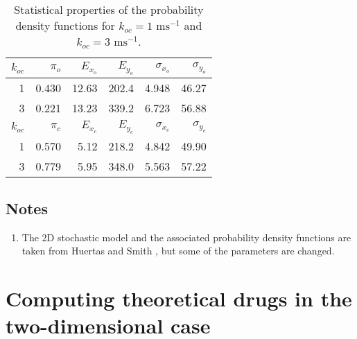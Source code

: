{
\begin{table}  \begin{center}
\begin{tabular}
[c]{|r|r|r|r||r|r|}\hline 
\rule{0pt}{4mm}   $k_{oc}$ & $\pi_o $ & $E_{x_o}$ & $E_{y_o}$
& $\sigma_{x_o}$ & $\sigma_{y_o}$
\\[1mm]\hline\hline
1 & 0.430 & 12.63 & 202.4 &4.948 &  46.27\\\hline
3 & 0.221 & 13.23 & 339.2 &6.723 &  56.88 \\ \hline \hline
\rule{0pt}{4mm} $k_{oc}$ & $\pi_c$ &$E_{x_c}$ & $E_{y_c}$ 
& $\sigma_{x_c}$ & $\sigma_{y_c}$
\\[1mm]\hline\hline
1 & 0.570& 5.12 & 218.2 &4.842 &  49.90\\\hline
3 & 0.779 &5.95& 348.0  &5.563 &  57.22\\\hline
\end{tabular}
 \end{center}
\caption{Statistical properties of the probability density functions 
for $k_{oc}=1 \text{ ms}^{-1}$ and  $k_{oc}=3 \text{ ms}^{-1}$.
\label{tab:more_open}}
\end{table}


\section{Notes}

\begin{enumerate}
\item The 2D stochastic model and the associated probability density functions are taken from Huertas and Smith \cite{Huertas2007}, but some of the parameters are changed.
\end{enumerate}

\chapter{Computing theoretical drugs in the two-dimensional case}



}
